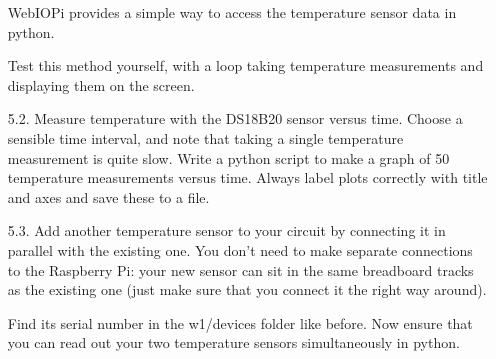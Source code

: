 \begin{enumerate}
\newpage
WebIOPi provides a simple way to access the temperature sensor data in python.


Test this method yourself, with a loop taking temperature measurements and displaying them on the screen.



\item[5.2.] Measure temperature with the DS18B20 sensor versus time.
Choose a sensible time interval, and note that taking a single temperature measurement is quite slow.
Write a python script to make a graph of 50 temperature measurements versus time.
Always label plots correctly with title and axes and save these to a file.
 

%



\item[5.3.]	Add another temperature sensor to your circuit by connecting it in parallel with the existing one. 
You don't need to make separate connections to the Raspberry Pi: your new sensor can sit in the same breadboard tracks as the existing one (just make sure that you connect it the right way around).

Find its serial number in the w1/devices folder like before.
Now ensure that you can read out your two temperature sensors simultaneously in python.

%

%
%


\end{enumerate}
